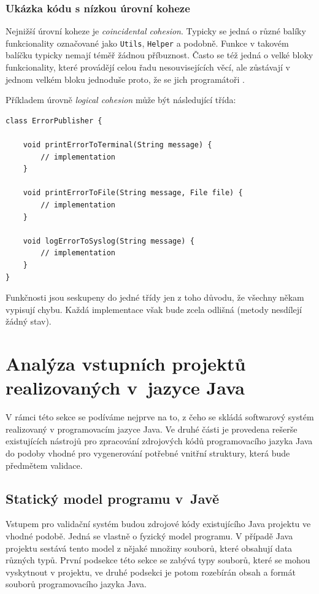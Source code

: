 \subsubsection{Ukázka kódu s nízkou úrovní koheze}
Nejnižší úrovní koheze je \emph{coincidental cohesion}. Typicky se jedná o různé balíky funkcionality označované jako \verb+Utils+, \verb+Helper+ a podobně. Funkce v takovém balíčku typicky nemají téměř žádnou příbuznost. Často se též jedná o velké bloky funkcionality, které provádějí celou řadu nesouvisejících věcí, ale zůstávají v jednom velkém bloku jednoduše proto, že se jich programátoři .

Příkladem úrovně \emph{logical cohesion} může být následující třída:

\begin{lstlisting}
class ErrorPublisher {

    void printErrorToTerminal(String message) {
        // implementation
    }

    void printErrorToFile(String message, File file) {
        // implementation
    }

    void logErrorToSyslog(String message) {
        // implementation
    }
}
\end{lstlisting}

Funkčnosti jsou seskupeny do jedné třídy jen z toho důvodu, že všechny někam vypisují chybu. Každá implementace však bude zcela odlišná (metody nesdílejí žádný stav).

\section{Analýza vstupních projektů realizovaných v~jazyce Java}

V rámci této sekce se podíváme nejprve na to, z čeho se skládá softwarový systém realizovaný v programovacím jazyce Java. Ve druhé části je provedena rešerše existujících nástrojů pro zpracování zdrojových kódů programovacího jazyka Java do podoby vhodné pro vygenerování potřebné vnitřní struktury, která bude předmětem validace.

\subsection{Statický model programu v~Javě}
Vstupem pro validační systém budou zdrojové kódy existujícího Java projektu ve vhodné podobě. Jedná se vlastně o fyzický model programu. V případě Java projektu sestává tento model z nějaké množiny souborů, které obsahují data různých typů. První podsekce této sekce se zabývá typy souborů, které se mohou vyskytnout v projektu, ve druhé podsekci je potom rozebírán obsah a formát souborů programovacího jazyka Java.

